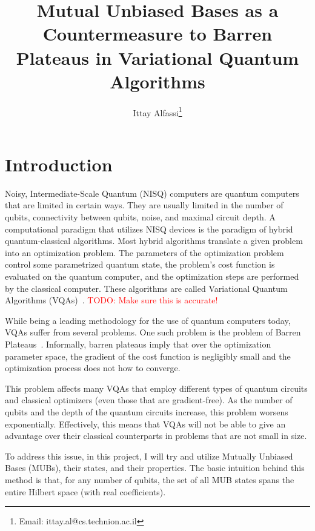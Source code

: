 \documentclass[a4paper,12pt]{article}
\title{Mutual Unbiased Bases as a Countermeasure to Barren Plateaus in Variational Quantum Algorithms}
\author{Ittay Alfassi\footnote{Email: ittay.al@cs.technion.ac.il}}
\newcommand{\mytodo}[1]{\textcolor{red}{TODO: #1}}
\begin{document}
\maketitle

\thispagestyle{fancy}

\tableofcontents

\section{Introduction}
Noisy, Intermediate-Scale Quantum (NISQ) computers are quantum computers that are limited in certain ways. They are usually limited in the number of qubits, connectivity between qubits, noise, and maximal circuit depth.
A computational paradigm that utilizes NISQ devices is the paradigm of hybrid quantum-classical algorithms.
Most hybrid algorithms translate a given problem into an optimization problem.
The parameters of the optimization problem control some parametrized quantum state, the problem's cost function is evaluated on the quantum computer, and the optimization steps are performed by the classical computer. These algorithms are called Variational Quantum Algorithms (VQAs)~\cite{Cerezo2021}. \mytodo{Make sure this is accurate!}

While being a leading methodology for the use of quantum computers today, VQAs suffer from several problems. One such problem is the problem of Barren Plateaus~\cite{mcclean_barren_2018}. Informally, barren plateaus imply that over the optimization parameter space, the gradient of the cost function is negligibly small and the optimization process does not how to converge.

This problem affects many  VQAs that employ different types of quantum circuits and classical optimizers (even those that are gradient-free). As the number of qubits and the depth of the quantum circuits increase, this problem worsens exponentially.
Effectively, this means that VQAs will not be able to give an advantage over their classical counterparts in problems that are not small in size.

To address this issue, in this project, I will try and utilize Mutually Unbiased Bases (MUBs), their states, and their properties.
The basic intuition behind this method is that, for any number of qubits, the set of all MUB states spans the entire Hilbert space (with real coefficients).
\end{document}
